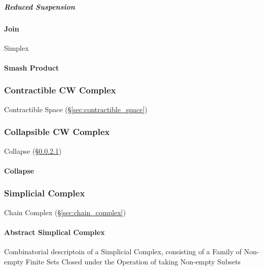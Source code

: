 \subparagraph{Reduced Suspension}\label{sec:reduced_suspension}\hfill



\paragraph{Join}\label{sec:join}\hfill

Simplex %



\paragraph{Smash Product}\label{sec:smash_product}\hfill



\subsubsection{Contractible CW Complex}
\label{sec:contractible_cwcomplex}

Contractible Space (\S\ref{sec:contractible_space})



\subsubsection{Collapsible CW Complex}
\label{sec:collapsible_cwcomplex}

Collapse (\S\ref{sec:collapse})



\paragraph{Collapse}\label{sec:collapse}\hfill



\subsubsection{Simplicial Complex}\label{sec:simplicial_complex}

Chain Complex (\S\ref{sec:chain_complex})



\paragraph{Abstract Simplical Complex}\label{sec:abstract_complex}\hfill

Combinatorial descriptoin of a Simplicial Complex, consisting of a Family of
Non-empty Finite Sets Closed under the Operation of taking Non-empty Subsets

